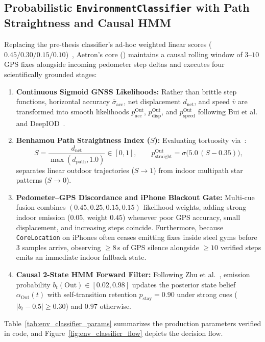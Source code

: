 \subsection{Probabilistic \texorpdfstring{\texttt{EnvironmentClassifier}}{EnvironmentClassifier} with Path Straightness and Causal HMM}
Replacing the pre-thesis classifier's ad-hoc weighted linear scores ($0.45/0.30/0.15/0.10$)~\cite{aetron2026prethesis}, Aetron's core  () maintains a causal rolling window of $3$--$10$ GPS fixes alongside incoming pedometer step deltas and executes four scientifically grounded stages:
\begin{enumerate}
    \item \textbf{Continuous Sigmoid GNSS Likelihoods:} Rather than brittle step functions, horizontal accuracy $\bar{\sigma}_{\text{acc}}$, net displacement $d_{\text{net}}$, and speed $\bar{v}$ are transformed into smooth likelihoods $p_{\text{acc}}^{\text{Out}}$, $p_{\text{disp}}^{\text{Out}}$, and $p_{\text{speed}}^{\text{Out}}$ following Bui et al.~\cite{bui2020gpsiod} and DeepIOD~\cite{dastagir2024deepiod}.
    \item \textbf{Benhamou Path Straightness Index ($S$):} Evaluating tortuosity via~\cite{benhamou2004tortuosity}:
    \begin{equation}
        S = \frac{d_{\text{net}}}{\max(d_{\text{path}}, 1.0)} \in [0, 1], \qquad p_{\text{straight}}^{\text{Out}} = \sigma\bigl(5.0\,(S - 0.35)\bigr),
        \label{eq:benhamou_s}
    \end{equation}
    separates linear outdoor trajectories ($S \to 1$) from indoor multipath star patterns ($S \to 0$).
    \item \textbf{Pedometer--GPS Discordance and iPhone Blackout Gate:} Multi-cue fusion combines $(0.45, 0.25, 0.15, 0.15)$ likelihood weights, adding strong indoor emission ($0.05$, weight $0.45$) whenever poor GPS accuracy, small displacement, and increasing steps coincide. Furthermore, because \texttt{CoreLocation} on iPhones often ceases emitting fixes inside steel gyms before $3$ samples arrive, observing $\ge 8$\,s of GPS silence alongside $\ge 10$ verified steps emits an immediate indoor fallback state.
    \item \textbf{Causal 2-State HMM Forward Filter:} Following Zhu et al.~\cite{zhu2019fast}, emission probability $b_t(\text{Out}) \in [0.02, 0.98]$ updates the posterior state belief $\alpha_{\text{Out}}(t)$ with self-transition retention $p_{\text{stay}} = 0.90$ under strong cues ($|b_t - 0.5| \ge 0.30$) and $0.97$ otherwise.
\end{enumerate}
Table~\ref{tab:env_classifier_params} summarizes the production parameters verified in code, and Figure~\ref{fig:env_classifier_flow} depicts the decision flow.

